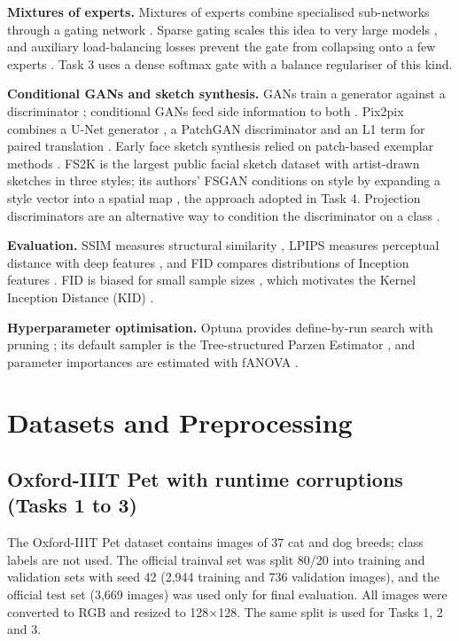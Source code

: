 \documentclass[conference]{IEEEtran}
\begin{document}
\textbf{Mixtures of experts.} Mixtures of experts combine specialised sub-networks through a gating network \cite{jacobs1991}. Sparse gating scales this idea to very large models \cite{shazeer2017}, and auxiliary load-balancing losses prevent the gate from collapsing onto a few experts \cite{shazeer2017,fedus2022}. Task 3 uses a dense softmax gate with a balance regulariser of this kind.

\textbf{Conditional GANs and sketch synthesis.} GANs train a generator against a discriminator \cite{goodfellow2014}; conditional GANs feed side information to both \cite{mirza2014}. Pix2pix combines a U-Net generator \cite{ronneberger2015}, a PatchGAN discriminator and an L1 term for paired translation \cite{isola2017}. Early face sketch synthesis relied on patch-based exemplar methods \cite{wang2009}. FS2K is the largest public facial sketch dataset with artist-drawn sketches in three styles; its authors' FSGAN conditions on style by expanding a style vector into a spatial map \cite{fan2022}, the approach adopted in Task 4. Projection discriminators are an alternative way to condition the discriminator on a class \cite{miyato2018proj}.

\textbf{Evaluation.} SSIM measures structural similarity \cite{wang2004}, LPIPS measures perceptual distance with deep features \cite{zhang2018lpips}, and FID compares distributions of Inception features \cite{heusel2017}. FID is biased for small sample sizes \cite{chong2020}, which motivates the Kernel Inception Distance (KID) \cite{binkowski2018}.

\textbf{Hyperparameter optimisation.} Optuna provides define-by-run search with pruning \cite{akiba2019}; its default sampler is the Tree-structured Parzen Estimator \cite{bergstra2011}, and parameter importances are estimated with fANOVA \cite{hutter2014}.

\section{Datasets and Preprocessing}

\subsection{Oxford-IIIT Pet with runtime corruptions (Tasks 1 to 3)}
The Oxford-IIIT Pet dataset \cite{parkhi2012} contains images of 37 cat and dog breeds; class labels are not used. The official trainval set was split 80/20 into training and validation sets with seed 42 (2,944 training and 736 validation images), and the official test set (3,669 images) was used only for final evaluation. All images were converted to RGB and resized to 128$\times$128. The same split is used for Tasks 1, 2 and 3.
\end{document}

